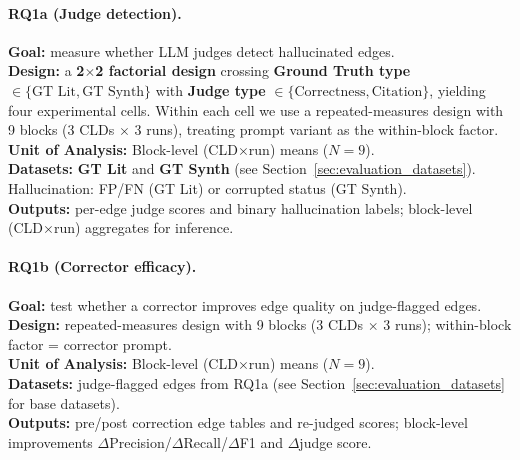 \paragraph{RQ1a (Judge detection).}
\begin{center}
\end{center}
\vspace{-0.8em}
\textbf{Goal:} measure whether LLM judges detect hallucinated edges.\\
\textbf{Design:} a \textbf{2$\times$2 factorial design} crossing \textbf{Ground Truth type} \(\in\{\text{GT Lit},\text{GT Synth}\}\) with \textbf{Judge type} \(\in\{\text{Correctness},\text{Citation}\}\), yielding four experimental cells. Within each cell we use a repeated-measures design with 9 blocks (3 CLDs $\times$ 3 runs), treating prompt variant as the within-block factor.\\
\textbf{Unit of Analysis:} Block-level (CLD$\times$run) means ($N=9$).\\
\textbf{Datasets:} \textbf{GT Lit} and \textbf{GT Synth} (see Section~\ref{sec:evaluation_datasets}). Hallucination: FP/FN (GT Lit) or corrupted status (GT Synth).\\
\textbf{Outputs:} per-edge judge scores and binary hallucination labels; block-level (CLD$\times$run) aggregates for inference.

\paragraph{RQ1b (Corrector efficacy).}
\begin{center}
\end{center}
\vspace{-0.8em}
\textbf{Goal:} test whether a corrector improves edge quality on judge-flagged edges.\\
\textbf{Design:} repeated-measures design with 9 blocks (3 CLDs $\times$ 3 runs); within-block factor = corrector prompt.\\
\textbf{Unit of Analysis:} Block-level (CLD$\times$run) means ($N=9$).\\
\textbf{Datasets:} judge-flagged edges from RQ1a (see Section~\ref{sec:evaluation_datasets} for base datasets).\\
\textbf{Outputs:} pre/post correction edge tables and re-judged scores; block-level improvements \(\Delta\)Precision/\(\Delta\)Recall/\(\Delta\)F1 and \(\Delta\)judge score.

